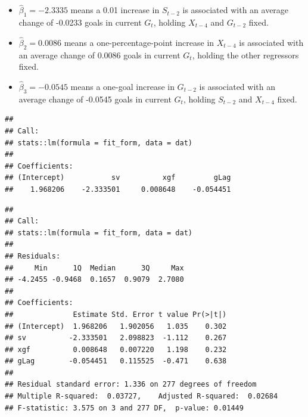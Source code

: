 \documentclass[
  10pt,
]{extarticle}
\newenvironment{Shaded}{\begin{snugshade}}{\end{snugshade}}
\newcommand{\CommentTok}[1]{\textcolor[rgb]{0.56,0.35,0.01}{\textit{#1}}}
\newcommand{\FunctionTok}[1]{\textcolor[rgb]{0.13,0.29,0.53}{\textbf{#1}}}
\newcommand{\NormalTok}[1]{#1}
\newcommand{\SpecialCharTok}[1]{\textcolor[rgb]{0.81,0.36,0.00}{\textbf{#1}}}
\providecommand{\tightlist}{%
  \setlength{\itemsep}{0pt}\setlength{\parskip}{0pt}}
\begin{document}
\begin{itemize}
\tightlist
\item
  \(\hat{\beta}_1=-2.3335\) means a 0.01 increase in \(S_{t-2}\) is associated with an average change of -0.0233 goals in current \(G_t\), holding \(X_{t-4}\) and \(G_{t-2}\) fixed.
\item
  \(\hat{\beta}_2=0.0086\) means a one-percentage-point increase in \(X_{t-4}\) is associated with an average change of 0.0086 goals in current \(G_t\), holding the other regressors fixed.
\item
  \(\hat{\beta}_3=-0.0545\) means a one-goal increase in \(G_{t-2}\) is associated with an average change of -0.0545 goals in current \(G_t\), holding \(S_{t-2}\) and \(X_{t-4}\) fixed.
\end{itemize}

\begin{Shaded}
\end{Shaded}

\begin{verbatim}
## 
## Call:
## stats::lm(formula = fit_form, data = dat)
## 
## Coefficients:
## (Intercept)           sv          xgf         gLag  
##    1.968206    -2.333501     0.008648    -0.054451
\end{verbatim}

\begin{Shaded}
\end{Shaded}

\begin{verbatim}
## 
## Call:
## stats::lm(formula = fit_form, data = dat)
## 
## Residuals:
##     Min      1Q  Median      3Q     Max 
## -4.2455 -0.9468  0.1657  0.9079  2.7080 
## 
## Coefficients:
##              Estimate Std. Error t value Pr(>|t|)
## (Intercept)  1.968206   1.902056   1.035    0.302
## sv          -2.333501   2.098823  -1.112    0.267
## xgf          0.008648   0.007220   1.198    0.232
## gLag        -0.054451   0.115525  -0.471    0.638
## 
## Residual standard error: 1.336 on 277 degrees of freedom
## Multiple R-squared:  0.03727,    Adjusted R-squared:  0.02684 
## F-statistic: 3.575 on 3 and 277 DF,  p-value: 0.01449
\end{verbatim}
\end{document}
